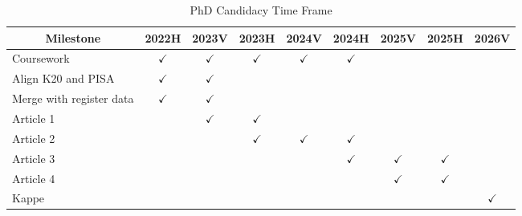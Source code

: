 \documentclass[
    a4paper,                %
    11pt,                   %
    stu,                    %
    donotrepeattitle,       %
    floatsintext,           %
    biblatex,               %
    colorlinks=true,        %
    linkcolor=red,          %
    anchorcolor=black,      %
    citecolor=blue,         %
    urlcolor=blue,          %
    bookmarks=true,         %
    bookmarksopen=false,    %
    bookmarksnumbered=true, %
    dvipsnames              %
]{apa7}
\begin{document}
\begin{table}[htbp]
    \begin{threeparttable}
    \caption{PhD Candidacy Time Frame}
    \label{tab:timeframe}
    \begin{tabular}{lcccccccc}
        \toprule
        \multicolumn{1}{c}{Milestone} & 2022H & 2023V & 2023H & 2024V & 2024H & 2025V & 2025H & 2026V \\
        \midrule
        Coursework & $\checkmark$     & $\checkmark$     & $\checkmark$     & $\checkmark$      & $\checkmark$      &       &       &  \\
        Align K20 and PISA & $\checkmark$     & $\checkmark$       &       &       &       &       &       &  \\
        Merge with register data & $\checkmark$     & $\checkmark$     &       &       &       &       &       &  \\
        Article 1 &       & $\checkmark$     & $\checkmark$     &       &       &       &       &  \\
        Article 2 &       &       & $\checkmark$     & $\checkmark$     & $\checkmark$     &       &       &  \\
        Article 3 &       &       &       &       & $\checkmark$     & $\checkmark$     & $\checkmark$     &  \\
        Article 4 &       &       &       &       &       & $\checkmark$     & $\checkmark$     &  \\
        Kappe &       &       &       &       &       &       &       & $\checkmark$ \\
        \bottomrule
        \end{tabular}
    \end{threeparttable}
\end{table}

\printbibliography
\end{document}
